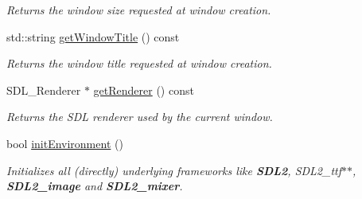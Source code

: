 \begin{DoxyCompactItemize}
\begin{DoxyCompactList}\small\item\em Returns the window size requested at window creation. \end{DoxyCompactList}\item 
std\+::string \hyperlink{classbkengine_1_1Core_a0c42cf916f6232e384ea6d7f326becd9}{get\+Window\+Title} () const
\begin{DoxyCompactList}\small\item\em Returns the window title requested at window creation. \end{DoxyCompactList}\item 
S\+D\+L\+\_\+\+Renderer $\ast$ \hyperlink{classbkengine_1_1Core_ae60422517185c5e03e754765af0806bb}{get\+Renderer} () const
\begin{DoxyCompactList}\small\item\em Returns the S\+DL renderer used by the current window. \end{DoxyCompactList}\item 
bool \hyperlink{classbkengine_1_1Core_a05f45aa1489fe4c7c2ebd4506b838a32}{init\+Environment} ()
\begin{DoxyCompactList}\small\item\em Initializes all (directly) underlying frameworks like {\bfseries S\+D\+L2}, S\+D\+L2\+\_\+ttf$\ast$$\ast$, {\bfseries S\+D\+L2\+\_\+image} and {\bfseries S\+D\+L2\+\_\+mixer}. \end{DoxyCompactList}\end{DoxyCompactItemize}
